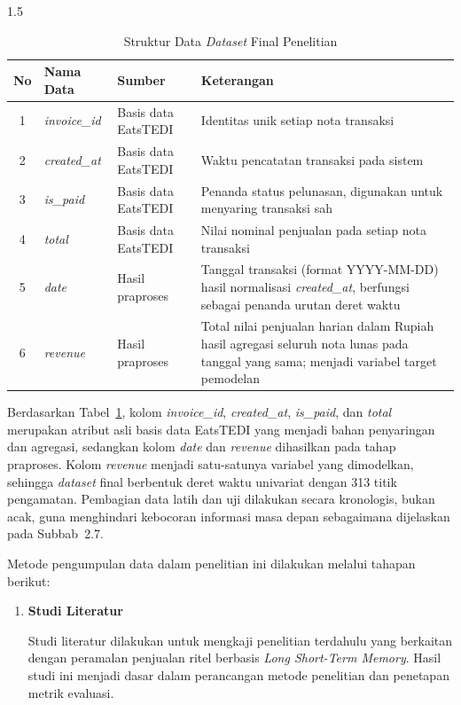 \documentclass[12pt, a4paper, onecolumn, oneside]{report}
\begin{document}
\begin{spacing}{1.5}
\begin{table}[H]
\centering
\caption{Struktur Data \textit{Dataset} Final Penelitian}
\label{tab:struktur_data}
\begin{tabularx}{\textwidth}{|c|l|p{3.0cm}|X|}
\hline
\textbf{No} & \textbf{Nama Data} & \textbf{Sumber} & \textbf{Keterangan} \\ \hline
1 & \textit{invoice\_id} & Basis data EatsTEDI & Identitas unik setiap nota transaksi \\ \hline
2 & \textit{created\_at} & Basis data EatsTEDI & Waktu pencatatan transaksi pada sistem \\ \hline
3 & \textit{is\_paid} & Basis data EatsTEDI & Penanda status pelunasan, digunakan untuk menyaring transaksi sah \\ \hline
4 & \textit{total} & Basis data EatsTEDI & Nilai nominal penjualan pada setiap nota transaksi \\ \hline
5 & \textit{date} & Hasil praproses & Tanggal transaksi (format YYYY-MM-DD) hasil normalisasi \textit{created\_at}, berfungsi sebagai penanda urutan deret waktu \\ \hline
6 & \textit{revenue} & Hasil praproses & Total nilai penjualan harian dalam Rupiah hasil agregasi seluruh nota lunas pada tanggal yang sama; menjadi variabel target pemodelan \\ \hline
\end{tabularx}
\end{table}

Berdasarkan Tabel~\ref{tab:struktur_data}, kolom \textit{invoice\_id}, \textit{created\_at}, \textit{is\_paid}, dan \textit{total} merupakan atribut asli basis data EatsTEDI yang menjadi bahan penyaringan dan agregasi, sedangkan kolom \textit{date} dan \textit{revenue} dihasilkan pada tahap praproses. Kolom \textit{revenue} menjadi satu-satunya variabel yang dimodelkan, sehingga \textit{dataset} final berbentuk deret waktu univariat dengan 313 titik pengamatan. Pembagian data latih dan uji dilakukan secara kronologis, bukan acak, guna menghindari kebocoran informasi masa depan sebagaimana dijelaskan pada Subbab~2.7.

Metode pengumpulan data dalam penelitian ini dilakukan melalui tahapan berikut:
\begin{enumerate}[label=\alph*.]
    \item \textbf{Studi Literatur}

    Studi literatur dilakukan untuk mengkaji penelitian terdahulu yang berkaitan dengan peramalan penjualan ritel berbasis \textit{Long Short-Term Memory}. Hasil studi ini menjadi dasar dalam perancangan metode penelitian dan penetapan metrik evaluasi.


\end{enumerate}
\end{spacing}
\end{document}
